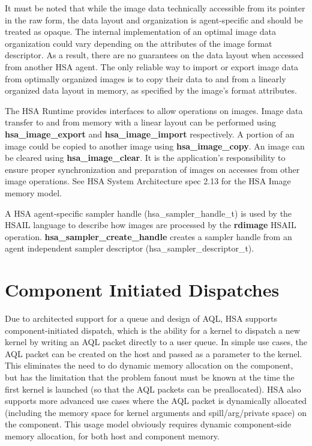 \documentclass[draft]{book}
\newcommand{\reffun}[1]{\textbf{#1}}
\newcommand{\reftyp}[1]{#1}
\newcommand{\refhsl}[1]{\reffun{#1}}
\begin{document}
It must be noted that while the image data technically accessible from its
pointer in the raw form, the data layout and organization is agent-specific and
should be treated as opaque. The internal implementation of an optimal image
data organization could vary depending on the attributes of the image format
descriptor. As a result, there are no guarantees on the data layout when
accessed from another HSA agent. The only reliable way to import or export image
data from optimally organized images is to copy their data to and from a
linearly organized data layout in memory, as specified by the image's format
attributes.

The HSA Runtime provides interfaces to allow operations on images. Image data
transfer to and from memory with a linear layout can be performed using
\reffun{hsa_image_export} and \reffun{hsa_image_import} respectively. A
portion of an image could be copied to another image using
\reffun{hsa_image_copy}. An image can be cleared using
\reffun{hsa_image_clear}. It is the application's responsibility to ensure
proper synchronization and preparation of images on accesses from other image
operations. See HSA System Architecture spec 2.13 for the HSA Image memory
model.

A HSA agent-specific sampler handle (\reftyp{hsa_sampler_handle_t}) is used by
the HSAIL language to describe how images are processed by the \refhsl{rdimage}
HSAIL operation. \reffun{hsa_sampler_create_handle} creates a sampler handle
from an agent independent sampler descriptor
(\reftyp{hsa_sampler_descriptor_t}).

\section{Component Initiated Dispatches} \label{architected}
\hypertarget{architectedchptr}{}

Due to architected support for a queue and design of AQL, HSA supports
component-initiated dispatch, which is the ability for a kernel to dispatch a
new kernel by writing an AQL packet directly to a user queue. In simple use
cases, the AQL packet can be created on the host and passed as a parameter to
the kernel. This eliminates the need to do dynamic memory allocation on the
component, but has the limitation that the problem fanout must be known at the
time the first kernel is launched (so that the AQL packets can be
preallocated). HSA also supports more advanced use cases where the AQL packet is
dynamically allocated (including the memory space for kernel arguments and
spill/arg/private space) on the component. This usage model obviously requires
dynamic component-side memory allocation, for both host and component memory.
\end{document}
